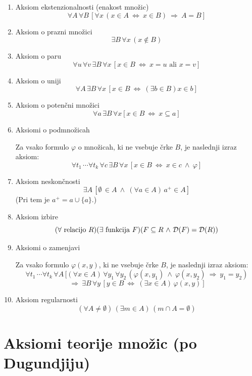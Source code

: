 \documentclass[11pt,paper=b5,footinclude,headinclude]{scrbook} %
\def\inn {{~\wedge~}}
\def\sledi {{~\Rightarrow~}}
\def\cee {{~\Leftrightarrow~}}
\begin{document}
\begin{enumerate}
  \item Aksiom ekstenzionalnosti (enakost množic)
  $$\forall A\, \forall B\, [\forall x \,(x\in A \cee x\in B) \sledi A = B]$$
  
  \item Aksiom o prazni množici
  $$\exists B\, \forall x\, (x\not \in B)$$

  \item Aksiom o paru
    $$\forall u\, \forall v\, \exists B\, \forall x\, [x\in B \cee x = u\textrm{ ali }x = v]$$

  \item Aksiom o uniji
    $$\forall A\, \exists B\, \forall x\, [x\in B \cee (\exists b\in B) x\in b]$$

  \item Aksiom o potenčni množici  
    $$\forall a\, \exists B\, \forall x [x\in B \cee x\subseteq a]$$

  \item Aksiomi o podmnožicah
   
  Za vsako formulo $\varphi$ o množicah, ki ne vsebuje črke $B$, 
  je naslednji izraz aksiom:  
$$\forall t_1\,\cdots \forall t_k\,\forall c\,\exists B \,\forall x \,[x\in B \cee x\in c \inn \varphi]$$

  \item Aksiom neskončnosti
$$\exists A\,[\emptyset \,\in A \inn (\forall a\in A)\, a^+\in A]$$
(Pri tem je $a^+ = a\cup \{a\}$.)

\item Aksiom izbire
$$(\forall \textrm{ relacijo }R)(\exists \textrm{ funkcija }F)(F\subseteq R \inn {\cal D}(F) = {\cal D}(R))$$

\item Aksiomi o zamenjavi 

Za vsako formulo $\varphi(x,y)$, ki ne vsebuje črke $B$, 
je naslednji izraz aksiom:
$$\forall t_1\,\cdots \forall t_k\,\forall A\,[(\forall x\in A)\,\forall y_1\, \forall y_2\, (\varphi(x,y_1) \inn \varphi(x,y_2) \sledi y_1 = y_2)$$
$$\sledi \exists B\, \forall y\, [y\in B \cee (\exists x\in A)\,\varphi(x,y)]$$

\item Aksiom regularnosti
$$(\forall A\neq \emptyset)\,(\exists m\in A)\,(m\cap A = \emptyset)$$
\end{enumerate}

\section{Aksiomi teorije množic (po Dugundjiju)}
\end{document}
